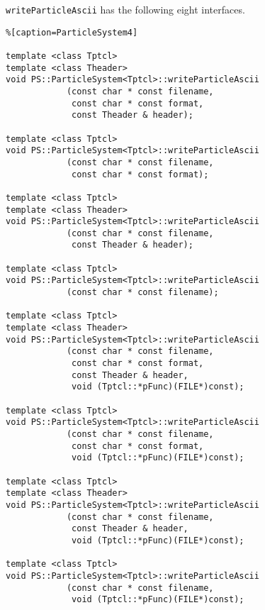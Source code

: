 \texttt{writeParticleAscii} has the following eight interfaces.
\begin{lstlisting}%[caption=ParticleSystem4]

template <class Tptcl>
template <class Theader>
void PS::ParticleSystem<Tptcl>::writeParticleAscii
            (const char * const filename,
             const char * const format,
             const Theader & header);
             
template <class Tptcl>
void PS::ParticleSystem<Tptcl>::writeParticleAscii
            (const char * const filename,
             const char * const format);

template <class Tptcl>
template <class Theader>
void PS::ParticleSystem<Tptcl>::writeParticleAscii
            (const char * const filename,
             const Theader & header);

template <class Tptcl>
void PS::ParticleSystem<Tptcl>::writeParticleAscii
            (const char * const filename);

template <class Tptcl>
template <class Theader>
void PS::ParticleSystem<Tptcl>::writeParticleAscii
            (const char * const filename,
             const char * const format,
             const Theader & header,
             void (Tptcl::*pFunc)(FILE*)const);

template <class Tptcl>
void PS::ParticleSystem<Tptcl>::writeParticleAscii
            (const char * const filename,
             const char * const format,
             void (Tptcl::*pFunc)(FILE*)const);

template <class Tptcl>             
template <class Theader>
void PS::ParticleSystem<Tptcl>::writeParticleAscii
            (const char * const filename,
             const Theader & header,
             void (Tptcl::*pFunc)(FILE*)const);
             
template <class Tptcl>                        
void PS::ParticleSystem<Tptcl>::writeParticleAscii
            (const char * const filename,
             void (Tptcl::*pFunc)(FILE*)const);
\end{lstlisting}

